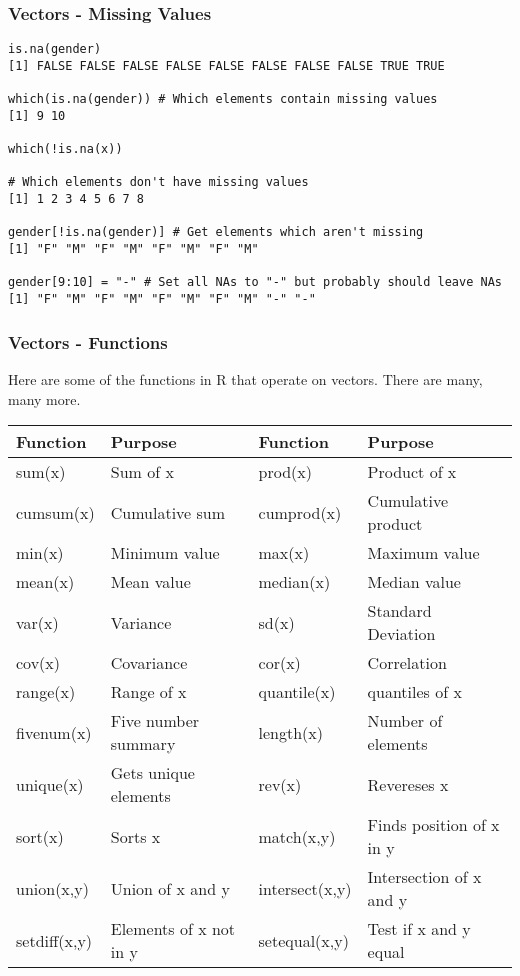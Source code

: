 \documentclass{beamer}
\begin{document}
% 
\begin{frame}[fragile]
\frametitle{Vectors - Missing Values}
\footnotesize
\begin{verbatim}
is.na(gender)
[1] FALSE FALSE FALSE FALSE FALSE FALSE FALSE FALSE TRUE TRUE

which(is.na(gender)) # Which elements contain missing values
[1] 9 10

which(!is.na(x))

# Which elements don't have missing values
[1] 1 2 3 4 5 6 7 8

gender[!is.na(gender)] # Get elements which aren't missing
[1] "F" "M" "F" "M" "F" "M" "F" "M"

gender[9:10] = "-" # Set all NAs to "-" but probably should leave NAs
[1] "F" "M" "F" "M" "F" "M" "F" "M" "-" "-"

\end{verbatim}
\end{frame}


\begin{frame}[fragile]
\frametitle{Vectors - Functions}
Here are some of the functions in R that operate on vectors. There are many, many more.
\newline

\footnotesize
\begin{tabular}{| l | l || l | l |}
  \hline         
  \textbf{Function} & \textbf{Purpose} & \textbf{Function} & \textbf{Purpose} \\ \hline
  sum(x) & Sum of x & prod(x) & Product of x  \\ \hline
  cumsum(x) & Cumulative sum & cumprod(x) & Cumulative product \\ \hline
  min(x) & Minimum value & max(x) & Maximum value \\ \hline
  mean(x) & Mean value & median(x) & Median value\\ \hline
  var(x) & Variance & sd(x) & Standard Deviation \\ \hline
  cov(x) & Covariance & cor(x) & Correlation \\ \hline
  range(x) & Range of x & quantile(x) & quantiles of x \\ \hline
  fivenum(x) & Five number summary & length(x) & Number of elements \\ \hline
  unique(x) & Gets unique elements & rev(x) & Revereses x \\ \hline
  sort(x) & Sorts x & match(x,y) & Finds position of x in y \\ \hline
  union(x,y) & Union of x and y & intersect(x,y) & Intersection of x and y \\ \hline
  setdiff(x,y) & Elements of x not in y & setequal(x,y) & Test if x and y equal \\
  \hline  
\end{tabular}
\end{frame}
\end{document}
